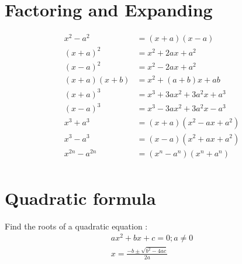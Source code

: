 \documentclass[10pt,onecolumn]{article}
\begin{document}
{%
\section{Factoring and Expanding}
\begin{align*}
x^2 - a^2  & =  (x+a)(x-a) \\
(x+a)^2  & =  x^2 + 2ax + a^2  \\
(x-a)^2  & =  x^2 - 2ax + a^2  \\
(x+a)(x+b)  & =  x^2 + (a+b)x + ab  \\
(x+a)^3  & = x^3 + 3ax^2 + 3a^{2}x + a^3 \\
(x-a)^3  & = x^3 - 3ax^2 + 3a^{2}x - a^3 \\
x^3 + a^3 & = (x+a)(x^2 - ax + a^2) \\
x^3 - a^3  & = (x-a)(x^2 + ax + a^2) \\
x^{2n} - a^{2n}  & = (x^n - a^n)(x^n + a^n) \\
\end{align*}


\section{Quadratic formula}
Find the roots of a quadratic equation : \\
\begin{align*}
ax^2 + bx + c = 0; a \neq 0  \\
x = \frac{-b \pm \sqrt{b^2 - 4ac}}{2a} 
\end{align*}

\pagebreak
}
\end{document}
